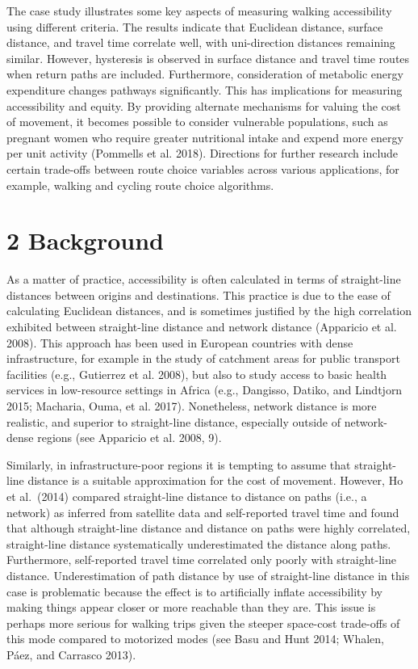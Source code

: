 \documentclass[]{elsarticle} %
\begin{document}
The case study illustrates some key aspects of measuring walking
accessibility using different criteria. The results indicate that
Euclidean distance, surface distance, and travel time correlate well,
with uni-direction distances remaining similar. However, hysteresis is
observed in surface distance and travel time routes when return paths
are included. Furthermore, consideration of metabolic energy expenditure
changes pathways significantly. This has implications for measuring
accessibility and equity. By providing alternate mechanisms for valuing
the cost of movement, it becomes possible to consider vulnerable
populations, such as pregnant women who require greater nutritional
intake and expend more energy per unit activity (Pommells et al. 2018).
Directions for further research include certain trade-offs between route
choice variables across various applications, for example, walking and
cycling route choice algorithms.

\hypertarget{background}{%
\section{2 Background}\label{background}}

As a matter of practice, accessibility is often calculated in terms of
straight-line distances between origins and destinations. This practice
is due to the ease of calculating Euclidean distances, and is sometimes
justified by the high correlation exhibited between straight-line
distance and network distance (Apparicio et al. 2008). This approach has
been used in European countries with dense infrastructure, for example
in the study of catchment areas for public transport facilities (e.g.,
Gutierrez et al. 2008), but also to study access to basic health
services in low-resource settings in Africa (e.g., Dangisso, Datiko, and
Lindtjorn 2015; Macharia, Ouma, et al. 2017). Nonetheless, network
distance is more realistic, and superior to straight-line distance,
especially outside of network-dense regions (see Apparicio et al. 2008,
9).

Similarly, in infrastructure-poor regions it is tempting to assume that
straight-line distance is a suitable approximation for the cost of
movement. However, Ho et al.~(2014) compared straight-line distance to
distance on paths (i.e., a network) as inferred from satellite data and
self-reported travel time and found that although straight-line distance
and distance on paths were highly correlated, straight-line distance
systematically underestimated the distance along paths. Furthermore,
self-reported travel time correlated only poorly with straight-line
distance. Underestimation of path distance by use of straight-line
distance in this case is problematic because the effect is to
artificially inflate accessibility by making things appear closer or
more reachable than they are. This issue is perhaps more serious for
walking trips given the steeper space-cost trade-offs of this mode
compared to motorized modes (see Basu and Hunt 2014; Whalen, Páez, and
Carrasco 2013).
\end{document}
